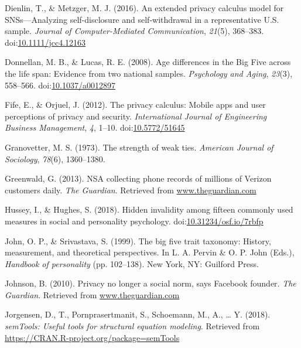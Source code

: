 \documentclass[man,floatsintext]{apa6}
\begin{document}
\leavevmode\hypertarget{ref-Dienlin.2016a}{}%
Dienlin, T., \& Metzger, M. J. (2016). An extended privacy calculus model for SNSs---Analyzing self-disclosure and self-withdrawal in a representative U.S. sample. \emph{Journal of Computer-Mediated Communication}, \emph{21}(5), 368--383. doi:\href{https://doi.org/10.1111/jcc4.12163}{10.1111/jcc4.12163}

\leavevmode\hypertarget{ref-Donnellan.2008}{}%
Donnellan, M. B., \& Lucas, R. E. (2008). Age differences in the Big Five across the life span: Evidence from two national samples. \emph{Psychology and Aging}, \emph{23}(3), 558--566. doi:\href{https://doi.org/10.1037/a0012897}{10.1037/a0012897}

\leavevmode\hypertarget{ref-Fife.2012}{}%
Fife, E., \& Orjuel, J. (2012). The privacy calculus: Mobile apps and user perceptions of privacy and security. \emph{International Journal of Engineering Business Management}, \emph{4}, 1--10. doi:\href{https://doi.org/10.5772/51645}{10.5772/51645}

\leavevmode\hypertarget{ref-Granovetter.1973}{}%
Granovetter, M. S. (1973). The strength of weak ties. \emph{American Journal of Sociology}, \emph{78}(6), 1360--1380.

\leavevmode\hypertarget{ref-Greenwald.2013}{}%
Greenwald, G. (2013). NSA collecting phone records of millions of Verizon customers daily. \emph{The Guardian}. Retrieved from \url{www.theguardian.com}

\leavevmode\hypertarget{ref-Hussey.2018}{}%
Hussey, I., \& Hughes, S. (2018). Hidden invalidity among fifteen commonly used measures in social and personality psychology. doi:\href{https://doi.org/10.31234/osf.io/7rbfp}{10.31234/osf.io/7rbfp}

\leavevmode\hypertarget{ref-John.1999}{}%
John, O. P., \& Srivastava, S. (1999). The big five trait taxonomy: History, measurement, and theoretical perspectives. In L. A. Pervin \& O. P. John (Eds.), \emph{Handbook of personality} (pp. 102--138). New York, NY: Guilford Press.

\leavevmode\hypertarget{ref-Johnson.2010}{}%
Johnson, B. (2010). Privacy no longer a social norm, says Facebook founder. \emph{The Guardian}. Retrieved from \url{www.theguardian.com}

\leavevmode\hypertarget{ref-R-semTools}{}%
Jorgensen, D., T., Pornprasertmanit, S., Schoemann, M., A., \ldots{} Y. (2018). \emph{semTools: Useful tools for structural equation modeling}. Retrieved from \url{https://CRAN.R-project.org/package=semTools}
\end{document}
